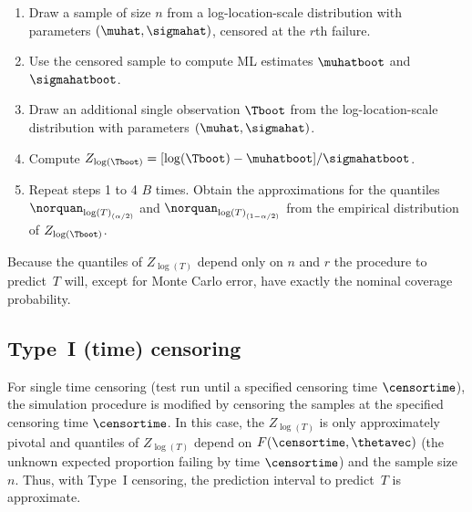 \begin{enumerate}
\item
Draw a sample of size $n$ from a log-location-scale distribution
with parameters $(\muhat,\sigmahat)$, censored at the $r$th failure.
\item
Use the censored sample to compute ML estimates $\muhatboot$ and
$\sigmahatboot$.
\item
Draw an additional single observation $\Tboot$ from
the log-location-scale distribution with parameters $(\muhat,\sigmahat)$.
\item
Compute $Z_{\log(\Tboot)}=[\log(\Tboot)-\muhatboot]/\sigmahatboot$.
\item
Repeat steps 1 to 4 $B$ times. Obtain the approximations for the
quantiles $\norquan_{{\log(T)}_{(\alpha/2)}}$ and
$\norquan_{{\log(T)}_{(1-\alpha/2)}}$ from the empirical
distribution of $Z_{\log(\Tboot)}$.
\end{enumerate}
Because the quantiles of $Z_{\log(T)}$ depend only on $n$ and $r$
the procedure to predict~$T$ will, except for Monte Carlo error, have
exactly the nominal coverage probability.

\subsection{Type~I (time) censoring}
For single time censoring (test run until a specified censoring time
$\censortime$), the simulation procedure is modified by censoring
the samples at the specified censoring time $\censortime$. In this
case, the $Z_{\log(T)}$ is only approximately pivotal and quantiles
of $Z_{\log(T)}$ depend on $F(\censortime,\thetavec)$ (the unknown
expected proportion failing by time $\censortime$) and the sample
size $n$. Thus, with Type~I censoring, the prediction interval to
predict~$T$ is approximate.


